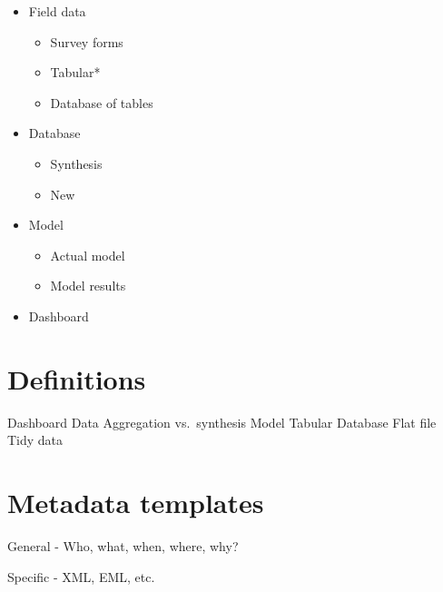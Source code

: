 \documentclass[
]{book}
\providecommand{\tightlist}{%
  \setlength{\itemsep}{0pt}\setlength{\parskip}{0pt}}
\begin{document}
\begin{itemize}
\tightlist
\item
  Field data

  \begin{itemize}
  \tightlist
  \item
    Survey forms
  \item
    Tabular*
  \item
    Database of tables
  \end{itemize}
\item
  Database

  \begin{itemize}
  \tightlist
  \item
    Synthesis
  \item
    New
  \end{itemize}
\item
  Model

  \begin{itemize}
  \tightlist
  \item
    Actual model
  \item
    Model results
  \end{itemize}
\item
  Dashboard
\end{itemize}

\hypertarget{definitions}{%
\section{Definitions}\label{definitions}}

Dashboard
Data
Aggregation vs.~synthesis
Model
Tabular
Database
Flat file
Tidy data

\hypertarget{metadata-templates}{%
\section{Metadata templates}\label{metadata-templates}}

General - Who, what, when, where, why?

Specific - XML, EML, etc.

  
\end{document}
